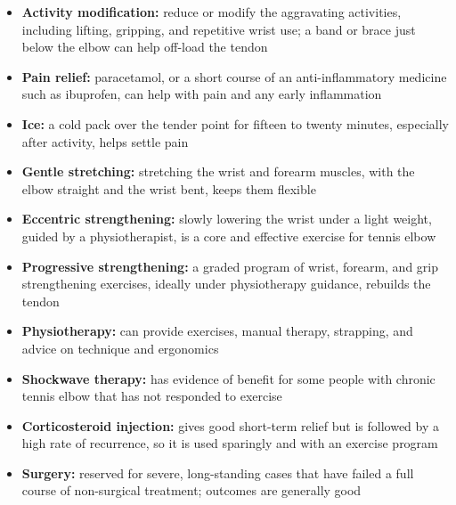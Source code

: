 \begin{itemize}
    \item \textbf{Activity modification:} reduce or modify the aggravating activities, including lifting, gripping, and repetitive wrist use; a band or brace just below the elbow can help off-load the tendon
    \item \textbf{Pain relief:} paracetamol, or a short course of an anti-inflammatory medicine such as ibuprofen, can help with pain and any early inflammation
    \item \textbf{Ice:} a cold pack over the tender point for fifteen to twenty minutes, especially after activity, helps settle pain
    \item \textbf{Gentle stretching:} stretching the wrist and forearm muscles, with the elbow straight and the wrist bent, keeps them flexible
    \item \textbf{Eccentric strengthening:} slowly lowering the wrist under a light weight, guided by a physiotherapist, is a core and effective exercise for tennis elbow
    \item \textbf{Progressive strengthening:} a graded program of wrist, forearm, and grip strengthening exercises, ideally under physiotherapy guidance, rebuilds the tendon
    \item \textbf{Physiotherapy:} can provide exercises, manual therapy, strapping, and advice on technique and ergonomics
    \item \textbf{Shockwave therapy:} has evidence of benefit for some people with chronic tennis elbow that has not responded to exercise
    \item \textbf{Corticosteroid injection:} gives good short-term relief but is followed by a high rate of recurrence, so it is used sparingly and with an exercise program
    \item \textbf{Surgery:} reserved for severe, long-standing cases that have failed a full course of non-surgical treatment; outcomes are generally good
\end{itemize}

